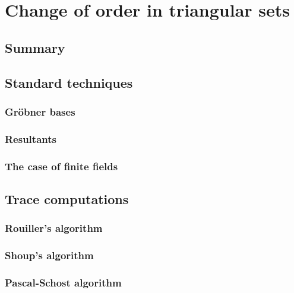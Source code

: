\newcommand{\AS}[1]{\mathcal{#1}}  %
\newcommand{\biv}[1]{\mathfrak{#1}}  %
\newcommand{\vect}[1]{\vec{#1}}  %
\newcommand{\bs}{\mathbf{s}}  %
\newcommand{\bC}{\mathbf{C}}  %
\newcommand{\bB}{\mathbf{B}}  %
\newcommand{\bD}{\mathbf{D}}  %
\newcommand{\bP}{\mathbf{P}}  %

\newcommand{\sC}{\mathsf{K}}  %
\renewcommand{\L}{\mathsf{L}}  %

\part{Change of order in triangular sets}

\chapter{Summary}


\chapter{Standard techniques}
\section{Gröbner bases}
\section{Resultants}
\section{The case of finite fields}


\chapter{Trace computations}
\section{Rouiller's algorithm}
\section{Shoup's algorithm}
\section{Pascal-Schost algorithm}

